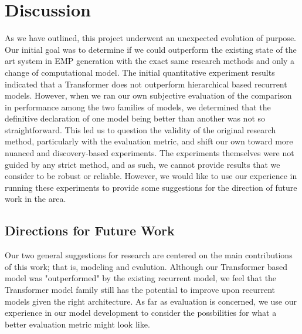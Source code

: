 \chapter{Discussion} \label{ch:ch6}
As we have outlined, this project underwent an unexpected evolution of purpose. Our initial goal was to determine if we could outperform the existing state of the art system in EMP generation with the exact same research methods and only a change of computational model. The initial quantitative experiment results indicated that a Transformer does not outperform hierarchical based recurrent models. However, when we ran our own subjective evaluation of the comparison in performance among the two families of models, we determined that the definitive declaration of one model being better than another was not so straightforward. This led us to question the validity of the original research method, particularly with the evaluation metric, and shift our own toward more nuanced and discovery-based experiments. The experiments themselves were not guided by any strict method, and as such, we cannot provide results that we consider to be robust or reliable. However, we would like to use our experience in running these experiments to provide some suggestions for the direction of future work in the area. 

\section{Directions for Future Work}
Our two general suggestions for research are centered on the main contributions of this work; that is, modeling and evalution. Although our Transformer based model was "outperformed" by the existing recurrent model, we feel that the Transformer model family still has the potential to improve upon recurrent models given the right architecture. As far as evaluation is concerned, we use our experience in our model development to consider the possbilities for what a better evaluation metric might look like. 

